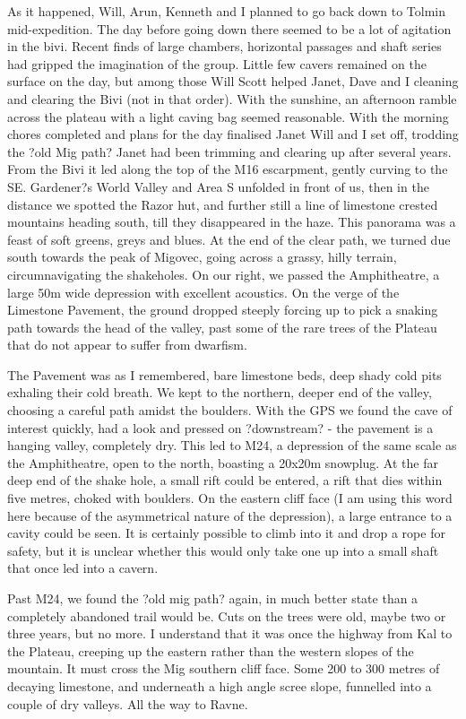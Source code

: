\documentclass[onecolumn]{book}
\begin{document}
As it happened, Will, Arun, Kenneth and I planned to go back down to Tolmin mid-expedition. The day before going down there seemed to be a lot of agitation in the bivi. Recent finds of large chambers, horizontal passages and shaft series had gripped the imagination of the group. Little few cavers remained on the surface on the day, but among those Will Scott helped Janet, Dave and I cleaning and clearing the Bivi (not in that order). With the sunshine, an afternoon ramble across the plateau with a light caving bag seemed reasonable. With the morning chores completed and plans for the day finalised Janet Will and I set off, trodding the ?old Mig path? Janet had been trimming and clearing up after several years. From the Bivi it led along the top of the M16 escarpment, gently curving to the SE. Gardener?s World Valley and Area S unfolded in front of us, then in the distance we spotted the Razor hut, and further still a line of limestone crested mountains heading south, till they disappeared in the haze. This panorama was a feast of soft greens, greys and blues. At the end of the clear path, we turned due south towards the peak of Migovec, going across a grassy, hilly terrain, circumnavigating the shakeholes. On our right, we passed the Amphitheatre, a large 50m wide depression with excellent acoustics. On the verge of the Limestone Pavement, the ground dropped steeply forcing up to pick a snaking path towards the head of the valley, past some of the rare trees of the Plateau that do not appear to suffer from dwarfism. 

The Pavement was as I remembered, bare limestone beds, deep shady cold pits exhaling their cold breath. We kept to the northern, deeper end of the valley, choosing a careful path amidst the boulders. With the GPS we found the cave of interest quickly, had a look and pressed on ?downstream? - the pavement is a hanging valley, completely dry. This led to M24, a depression of the same scale as the Amphitheatre, open to the north, boasting a 20x20m snowplug. At the far deep end of the shake hole, a small rift could be entered, a rift that dies within five metres, choked with boulders. On the eastern cliff face  (I am using this word here because of the asymmetrical nature of the depression), a large entrance to a cavity could be seen. It is certainly possible to climb into it and drop a rope for safety, but it is unclear whether this would only take one up into a small shaft that once led into a cavern. 

Past M24, we found the ?old mig path? again, in much better state than a completely abandoned trail would be. Cuts on the trees were old, maybe two or three years, but no more. I understand that it was once the highway from Kal to the Plateau, creeping up the eastern rather than the western slopes of the mountain. It must cross the Mig southern cliff face. Some 200 to 300 metres of decaying limestone, and underneath a high angle scree slope, funnelled into a couple of dry valleys. All the way to Ravne. 
\end{document}
